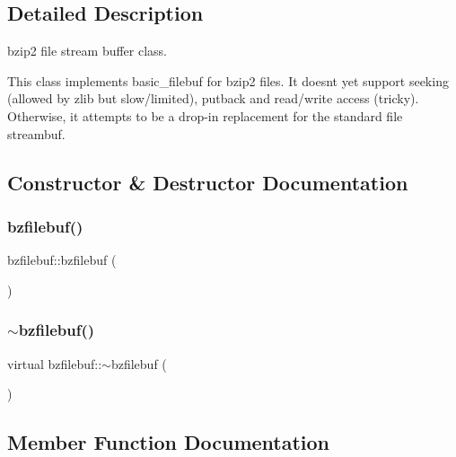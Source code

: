 \subsection{Detailed Description}
bzip2 file stream buffer class. 

This class implements basic\+\_\+filebuf for bzip2 files. It doesn\textquotesingle{}t yet support seeking (allowed by zlib but slow/limited), putback and read/write access (tricky). Otherwise, it attempts to be a drop-\/in replacement for the standard file streambuf. 

\subsection{Constructor \& Destructor Documentation}
\mbox{\label{classbzfilebuf_a1fbb7d1be868faca37feff9594d0bf29}} 
\subsubsection{\texorpdfstring{bzfilebuf()}{bzfilebuf()}}
{\footnotesize\ttfamily bzfilebuf\+::bzfilebuf (\begin{DoxyParamCaption}{ }\end{DoxyParamCaption})}

\mbox{\label{classbzfilebuf_a3aa5be3f60dc3f5d62deeb49a038fe38}} 
\subsubsection{\texorpdfstring{$\sim$bzfilebuf()}{~bzfilebuf()}}
{\footnotesize\ttfamily virtual bzfilebuf\+::$\sim$bzfilebuf (\begin{DoxyParamCaption}{ }\end{DoxyParamCaption})\hspace{0.3cm}{\ttfamily [virtual]}}



\subsection{Member Function Documentation}
\mbox{\label{classbzfilebuf_adacbc3f52d2128792ff0c14e5201b3cd}} 
